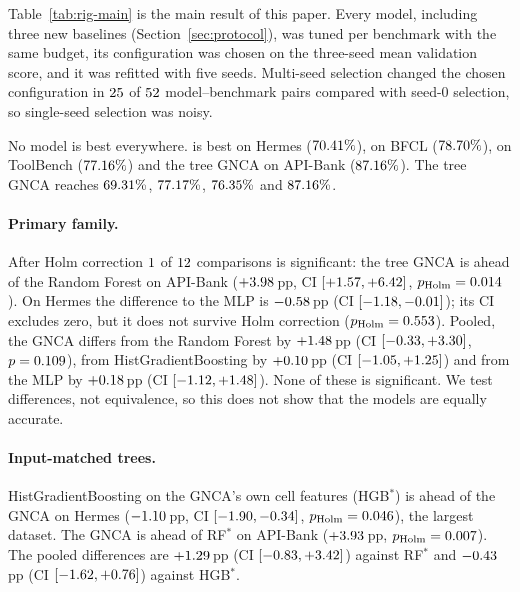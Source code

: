 \documentclass[10pt,twocolumn,letterpaper]{article}
\begin{document}
Table~\ref{tab:rig-main} is the main result of this paper. Every model, including three new baselines (Section~\ref{sec:protocol}), was tuned per benchmark with the same budget, its configuration was chosen on the three-seed mean validation score, and it was refitted with five seeds. Multi-seed selection changed the chosen configuration in $25$ of $52$ model--benchmark pairs compared with seed-0 selection, so single-seed selection was noisy.

No model is best everywhere. \numRHerBest{} is best on Hermes ($70.41\%$), \numRBfclBest{} on BFCL ($78.70\%$), \numRTbBest{} on ToolBench ($77.16\%$) and the tree GNCA on API-Bank ($87.16\%$). The tree GNCA reaches $69.31\%$, $77.17\%$, $76.35\%$ and $87.16\%$.

\paragraph{Primary family.} After Holm correction $1$ of $12$ comparisons is significant: the tree GNCA is ahead of the Random Forest on API-Bank ($+3.98$\,pp, CI $[+1.57, +6.42]$, $p_{\text{Holm}}=0.014$). On Hermes the difference to the MLP is $-0.58$\,pp (CI $[-1.18, -0.01]$); its CI excludes zero, but it does not survive Holm correction ($p_{\text{Holm}}=0.553$). Pooled, the GNCA differs from the Random Forest by $+1.48$\,pp (CI $[-0.33, +3.30]$, $p=0.109$), from HistGradientBoosting by $+0.10$\,pp (CI $[-1.05, +1.25]$) and from the MLP by $+0.18$\,pp (CI $[-1.12, +1.48]$). None of these is significant. We test differences, not equivalence, so this does not show that the models are equally accurate.

\paragraph{Input-matched trees.} HistGradientBoosting on the GNCA's own cell features (HGB$^\ast$) is ahead of the GNCA on Hermes ($-1.10$\,pp, CI $[-1.90, -0.34]$, $p_{\text{Holm}}=0.046$), the largest dataset. The GNCA is ahead of RF$^\ast$ on API-Bank ($+3.93$\,pp, $p_{\text{Holm}}=0.007$). The pooled differences are $+1.29$\,pp (CI $[-0.83, +3.42]$) against RF$^\ast$ and $-0.43$\,pp (CI $[-1.62, +0.76]$) against HGB$^\ast$.
\end{document}
